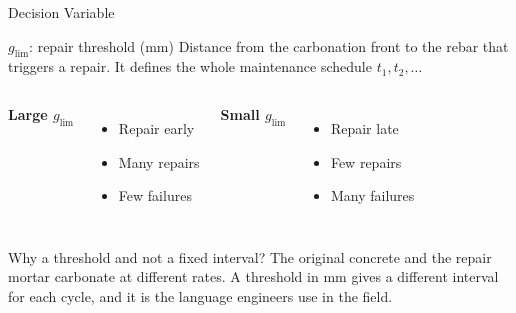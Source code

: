 \begin{frame}{Decision Variable}

\justifying

\begin{exampleblock}{$g_\mathrm{lim}$: repair threshold (mm)}
\justifying
Distance from the carbonation front to the rebar that triggers a repair.
It defines the whole maintenance schedule $t_1, t_2, \dots$
\end{exampleblock}

\vspace{0.3cm}

\begin{columns}[T,onlytextwidth]
  \textbf{Large $g_\mathrm{lim}$}
  \begin{itemize}
    \item Repair early
    \item Many repairs
    \item Few failures
  \end{itemize}

  \textbf{Small $g_\mathrm{lim}$}
  \begin{itemize}
    \item Repair late
    \item Few repairs
    \item Many failures
  \end{itemize}
\end{columns}

\vspace{0.3cm}

\begin{block}{Why a threshold and not a fixed interval?}
\justifying
The original concrete and the repair mortar carbonate at different rates.
A threshold in mm gives a different interval for each cycle, and it is the language engineers use in the field.
\end{block}

\end{frame}
